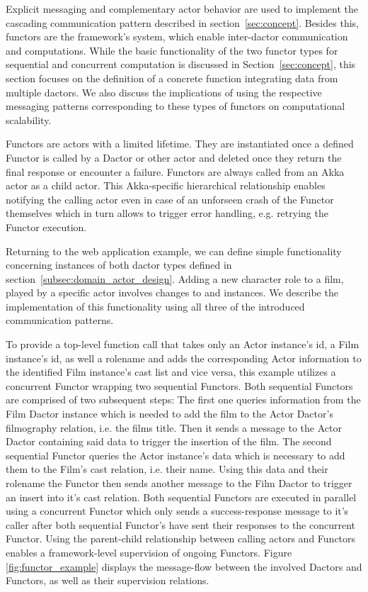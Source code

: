 Explicit messaging and complementary actor behavior are used to implement the cascading communication pattern described in section~\ref{sec:concept}.
Besides this, \glspl{functor} are the framework's system, which enable inter-\gls{dactor} communication and computations.
While the basic functionality of the two \gls{functor} types for sequential and concurrent computation is discussed in Section~\ref{sec:concept}, this section focuses on the definition of a concrete function integrating data from multiple \glspl{dactor}.
We also discuss the implications of using the respective messaging patterns corresponding to these types of \glspl{functor} on computational scalability.

Functors are actors with a limited lifetime.
They are instantiated once a defined Functor is called by a Dactor or other actor and deleted once they return the final response or encounter a failure.
Functors are always called from an Akka actor as a child actor.
This Akka-specific hierarchical relationship enables notifying the calling actor even in case of an unforseen crash of the Functor themselves which in turn allows to trigger error handling, e.g. retrying the Functor execution.

Returning to the web application example, we can define simple functionality concerning instances of both \gls{dactor} types defined in section~\ref{subsec:domain_actor_design}.
Adding a new character role to a film, played by a specific actor involves changes to  and  instances.
We describe the implementation of this functionality using all three of the introduced communication patterns.

To provide a top-level function call that takes only an Actor instance's id, a Film instance's id, as well a rolename and adds the corresponding Actor information to the identified Film instance's cast list and vice versa, this example utilizes a concurrent Functor wrapping two sequential Functors.
Both sequential Functors are comprised of two subsequent steps:
The first one queries information from the Film Dactor instance which is needed to add the film to the Actor Dactor's filmography relation, i.e. the films title.
Then it sends a message to the Actor Dactor containing said data to trigger the insertion of the film.
The second sequential Functor queries the Actor instance's data which is necessary to add them to the Film's cast relation, i.e. their name. Using this data and their rolename the Functor then sends another message to the Film Dactor to trigger an insert into it's cast relation.
Both sequential Functors are executed in parallel using a concurrent Functor which only sends a success-response message to it's caller after both sequential Functor's have sent their responses to the concurrent Functor.
Using the parent-child relationship between calling actors and Functors enables a framework-level supervision of ongoing Functors.
Figure \ref{fig:functor_example} displays the message-flow between the involved Dactors and Functors, as well as their supervision relations.



